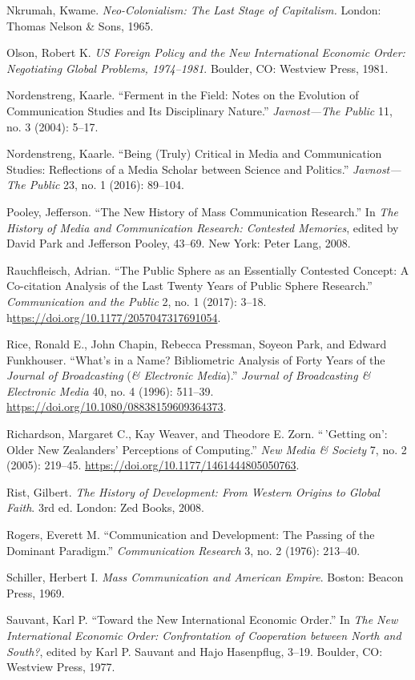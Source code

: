 \documentclass{tufte-handout}
\begin{document}
\begin{hangparas}{.25in}{1}
Nkrumah, Kwame. \emph{Neo-Colonialism: The Last Stage of Capitalism.}
London: Thomas Nelson \& Sons, 1965.

Olson, Robert K. \emph{US Foreign Policy and the New International
Economic Order: Negotiating Global Problems, 1974--1981}. Boulder, CO:
Westview Press, 1981.

Nordenstreng, Kaarle. ``Ferment in the Field: Notes on the Evolution of
Communication Studies and Its Disciplinary Nature.'' \emph{Javnost­---The
Public} 11, no. 3 (2004): 5--17.

Nordenstreng, Kaarle. ``Being (Truly) Critical in Media and
Communication Studies: Reflections of a Media Scholar between Science
and Politics.'' \emph{Javnost---The Public} 23, no. 1 (2016): 89--104.

Pooley, Jefferson. ``The New History of Mass Communication Research.''
In \emph{The History of Media and Communication Research: Contested
Memories}, edited by David Park and Jefferson Pooley, 43--69. New York:
Peter Lang, 2008.

Rauchfleisch, Adrian. ``The Public Sphere as an Essentially Contested
Concept: A Co-citation Analysis of the Last Twenty Years of Public
Sphere Research.'' \emph{Communication and the Public} 2, no. 1 (2017):
3--18. h\url{ttps://doi.org/10.1177/2057047317691054}.

Rice, Ronald E., John Chapin, Rebecca Pressman, Soyeon Park, and Edward
Funkhouser. ``What's in a Name? Bibliometric Analysis of Forty Years of
the \emph{Journal of Broadcasting} (\emph{\& Electronic Media}).''
\emph{Journal of Broadcasting \& Electronic Media} 40, no. 4 (1996):
511--39. \url{https://doi.org/10.1080/08838159609364373}.

Richardson, Margaret C., Kay Weaver, and Theodore E. Zorn. ``\,'Getting
on': Older New Zealanders' Perceptions of Computing.'' \emph{New Media
\& Society} 7, no. 2 (2005): 219--45.
\url{https://doi.org/10.1177/1461444805050763}.

Rist, Gilbert. \emph{The History of Development: From Western Origins to
Global Faith}. 3rd ed. London: Zed Books, 2008.

Rogers, Everett M. ``Communication and Development: The Passing of the
Dominant Paradigm.'' \emph{Communication Research} 3, no. 2 (1976):
213--40.

Schiller, Herbert I. \emph{Mass Communication and American Empire}.
Boston: Beacon Press, 1969.

Sauvant, Karl P. ``Toward the New International Economic Order.'' In
\emph{The New International Economic Order: Confrontation of Cooperation
between North and South?}, edited by Karl P. Sauvant and Hajo
Hasenpflug, 3--19. Boulder, CO: Westview Press, 1977.


\end{hangparas}
\end{document}
